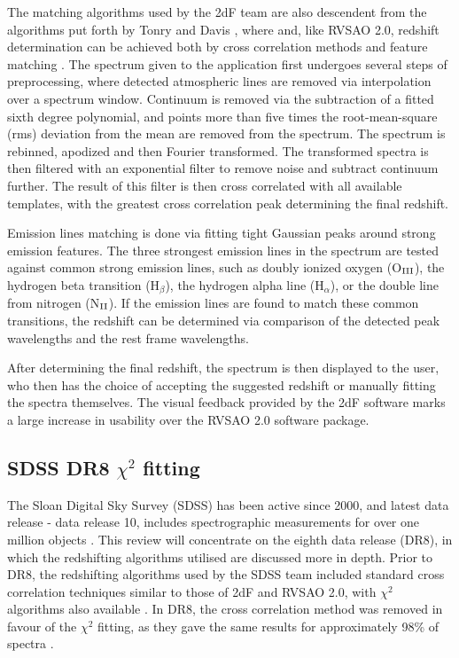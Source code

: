 \documentclass[titlesmallcaps, examinerscopy, copyrightpage]{uqthesis}
\begin{document}
The matching algorithms used by the 2dF team are also descendent from the algorithms put forth by Tonry and Davis \cite{tonry1979survey}, where and, like RVSAO 2.0, redshift determination can be achieved both by cross correlation methods and feature matching \cite{colless20012df}. The spectrum given to the application first undergoes several steps of preprocessing, where detected atmospheric lines are removed via interpolation over a spectrum window. Continuum is removed via the subtraction of a fitted sixth degree polynomial, and points more than five times the root-mean-square (rms) deviation from the mean are removed from the spectrum. The spectrum is rebinned, apodized and then Fourier transformed. The transformed spectra is then filtered with an exponential filter to remove noise and subtract continuum further. The result of this filter is then cross correlated with all available templates, with the greatest cross correlation peak determining the final redshift.

Emission lines matching is done via fitting tight Gaussian peaks around strong emission features. The three strongest emission lines in the spectrum are tested against common strong emission lines, such as doubly ionized oxygen (O$_{\rm{III}}$), the hydrogen beta transition (H$_\beta$), the hydrogen alpha line (H$_\alpha$), or the double line from nitrogen (N$_{\rm{II}}$). If the emission lines are found to match these common transitions, the redshift can be determined via comparison of the detected peak wavelengths and the rest frame wavelengths.

After determining the final redshift, the spectrum is then displayed to the user, who then has the choice of accepting the suggested redshift or manually fitting the spectra themselves. The visual feedback provided by the 2dF software marks a large increase in usability over the RVSAO 2.0 software package.



\subsection{SDSS DR8 $\chi^2$ fitting}

The Sloan Digital Sky Survey (SDSS) has been active since 2000, and latest data release - data release 10, includes spectrographic measurements for over one million objects \cite{SDSSIII}. This review will concentrate on the eighth data release (DR8), in which the redshifting algorithms utilised are discussed more in depth. Prior to DR8, the redshifting algorithms used by the SDSS team included standard cross correlation techniques similar to those of 2dF and RVSAO 2.0, with $\chi^2$ algorithms also available \cite{sdss6}. In DR8, the cross correlation method was removed in favour of the $\chi^2$ fitting, as they gave the same results for approximately 98\% of spectra \cite{aihara2011eighth}.
\end{document}
